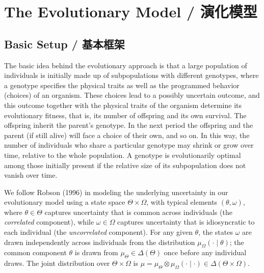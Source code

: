 \documentclass[12pt,a4paper]{article}
\newenvironment{original}
  {\par\noindent\color{black}\smallskip}
  {\par\smallskip}
\begin{document}
\newpage
\section{The Evolutionary Model / 演化模型}

\subsection{Basic Setup / 基本框架}

\begin{original}
The basic idea behind the evolutionary approach is that a large population of individuals is initially made up of subpopulations with different genotypes, where a genotype specifies the physical traits as well as the programmed behavior (choices) of an organism. These choices lead to a possibly uncertain outcome, and this outcome together with the physical traits of the organism determine its evolutionary fitness, that is, its number of offspring and its own survival. The offspring inherit the parent's genotype. In the next period the offspring and the parent (if still alive) will face a choice of their own, and so on. In this way, the number of individuals who share a particular genotype may shrink or grow over time, relative to the whole population. A genotype is evolutionarily optimal among those initially present if the relative size of its subpopulation does not vanish over time.

We follow Robson (1996) in modeling the underlying uncertainty in our evolutionary model using a state space $\Theta \times \Omega$, with typical elements $(\theta, \omega)$, where $\theta \in \Theta$ captures uncertainty that is common across individuals (the \emph{correlated} component), while $\omega \in \Omega$ captures uncertainty that is idiosyncratic to each individual (the \emph{uncorrelated} component). For any given $\theta$, the states $\omega$ are drawn independently across individuals from the distribution $\mu_\Omega(\cdot \mid \theta)$; the common component $\theta$ is drawn from $\mu_\Theta \in \Delta(\Theta)$ once before any individual draws. The joint distribution over $\Theta \times \Omega$ is $\mu = \mu_\Theta \otimes \mu_\Omega(\cdot \mid \cdot) \in \Delta(\Theta \times \Omega)$.
\end{original}
\end{document}
